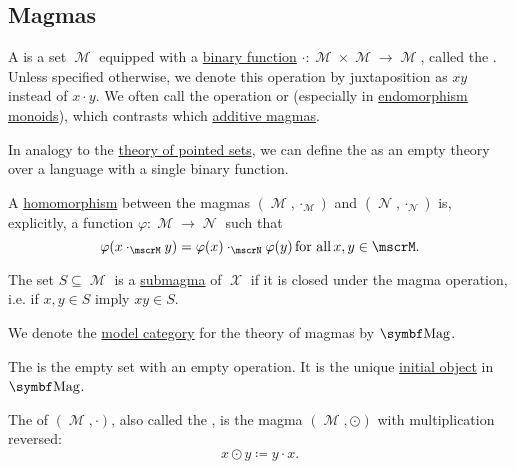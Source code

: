 \subsection{Magmas}\label{subsec:magmas}

\begin{definition}\label{def:magma}
  A  is a set \( \mscrM \) equipped with a \hyperref[def:function/arity]{binary function} \( \cdot: \mscrM \times \mscrM \to \mscrM \), called the . Unless specified otherwise, we denote this operation by juxtaposition as \( xy \) instead of \( x \cdot y \). We often call the operation  or  (especially in \hyperref[def:endomorphism_monoid]{endomorphism monoids}), which contrasts which \hyperref[rem:additive_magma]{additive magmas}.

  \begin{DefEnum}
     In analogy to the \hyperref[def:pointed_set/theory]{theory of pointed sets}, we can define the  as an empty theory over a language with a single binary function.

     A \hyperref[def:first_order_homomorphism]{homomorphism} between the magmas \( (\mscrM, \cdot_{\mscrM}) \) and \( (\mscrN, \cdot_{\mscrN}) \) is, explicitly, a function \( \varphi: \mscrM \to \mscrN \) such that
    \begin{equation}\label{eq:def:magma/homomorphism}
      \varphi(x \cdot_{\mscrM} y) = \varphi(x) \cdot_{\mscrN} \varphi(y) \T{for all} x, y \in \mscrM.
    \end{equation}

     The set \( S \subseteq \mscrM \) is a \hyperref[def:first_order_substructure]{submagma} of \( \mscrX \) if it is closed under the magma operation, i.e. if \( x, y \in S \) imply \( xy \in S \).

     We denote the \hyperref[def:first_order_model_category]{model category} for the theory of magmas by \( \Cat{Mag} \).

     The  is the empty set with an empty operation. It is the unique \hyperref[def:zero_objects/initial]{initial object} in \( \Cat{Mag} \).

     The  of \( (\mscrM, \cdot) \), also called the , is the magma \( (\mscrM, \odot) \) with multiplication reversed:
    \begin{equation*}
      x \odot y \coloneqq y \cdot x.
    \end{equation*}


\end{DefEnum}
\end{definition}
